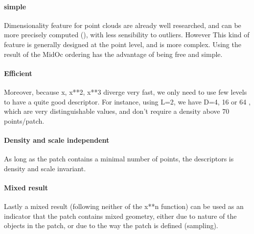			\paragraph{simple}
				Dimensionality feature for point clouds are already well researched, and can be more precisely computed (\cite{Demantke2014}), with less sensibility to outliers. However This kind of feature is generally designed at the point level, and is more complex.
				Using the result of the MidOc ordering has the advantage of being free and simple. 
			\paragraph{Efficient}
				Moreover, because x, x**2, x**3 diverge very fast, we only need to use few levels to have a quite good descriptor. For instance, using L=2, we have D=4, 16 or 64 , which are very distinguishable values, and don't require a density above 70 points/patch. 
			\paragraph{Density and scale independent}
				As long as the patch contains a minimal number of points, the descriptors is density and scale invariant.
			\paragraph{Mixed result}
				Lastly a mixed result (following neither of the x**n function) can be used as an indicator that the patch contains mixed geometry, either due to nature of the objects in the patch, or due to the way the patch is defined (sampling).
				
			
			
		
		
		
